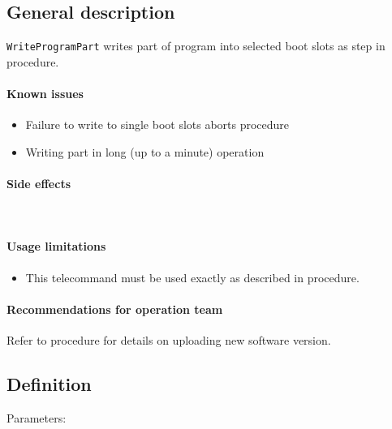 

\subsection{General description}
\texttt{WriteProgramPart} writes part of program into selected boot slots as step in  procedure.


\paragraph{Known issues}
\begin{itemize}
	\item Failure to write to single boot slots aborts procedure
	\item Writing part in long (up to a minute) operation
\end{itemize}

\paragraph{Side effects}\mbox{}\\ \None

\paragraph{Usage limitations}
\begin{itemize}
	\item This telecommand must be used exactly as described in  procedure.
\end{itemize}

\paragraph{Recommendations for operation team}
Refer to  procedure for details on uploading new software version.


\subsection{Definition}

Parameters: 

\begin{tcarglist}
\end{tcarglist}


